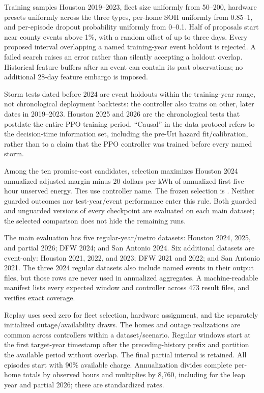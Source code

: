 Training samples Houston 2019--2023, fleet size uniformly from 50--200, hardware presets uniformly across the three types, per-home SOH uniformly from 0.85--1, and per-episode dropout probability uniformly from 0--0.1. Half of proposals start near county events above 1\%, with a random offset of up to three days. Every proposed interval overlapping a named training-year event holdout is rejected. A failed search raises an error rather than silently accepting a holdout overlap. Historical feature buffers after an event can contain its past observations; no additional 28-day feature embargo is imposed.

Storm tests dated before 2024 are event holdouts within the training-year range, not chronological deployment backtests: the controller also trains on other, later dates in 2019--2023. Houston 2025 and 2026 are the chronological tests that postdate the entire PPO training period. ``Causal'' in the data protocol refers to the decision-time information set, including the pre-Uri hazard fit/calibration, rather than to a claim that the PPO controller was trained before every named storm.

Among the ten promise-cost candidates, selection maximizes Houston 2024 annualized adjusted margin minus 20 dollars per kWh of annualized first-five-hour unserved energy. Ties use controller name. The frozen selection is \SelectedRun. Neither guarded outcomes nor test-year/event performance enter this rule. Both guarded and unguarded versions of every checkpoint are evaluated on each main dataset; the selected comparison does not hide the remaining runs.

The main evaluation has five regular-year/metro datasets: Houston 2024, 2025, and partial 2026; DFW 2024; and San Antonio 2024. Six additional datasets are event-only: Houston 2021, 2022, and 2023; DFW 2021 and 2022; and San Antonio 2021. The three 2024 regular datasets also include named events in their output files, but those rows are never used in annualized aggregates. A machine-readable manifest lists every expected window and controller across 473 result files, and verifies exact coverage.

Replay uses seed zero for fleet selection, hardware assignment, and the separately initialized outage/availability draws. The homes and outage realizations are common across controllers within a dataset/scenario. Regular windows start at the first target-year timestamp after the preceding-history prefix and partition the available period without overlap. The final partial interval is retained. All episodes start with 90\% available charge. Annualization divides complete per-home totals by observed hours and multiplies by 8,760, including for the leap year and partial 2026; these are standardized rates.

